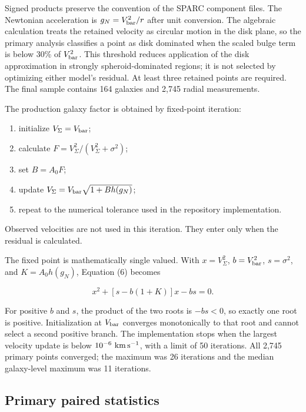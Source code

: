 \documentclass[utf8]{frontiers_suppmat}
\providecommand{\tightlist}{}
\begin{document}
Signed products preserve the convention of the SPARC component files. The Newtonian acceleration is \(g_N=V_{\rm bar}^2/r\) after unit conversion. The algebraic calculation treats the retained velocity as circular motion in the disk plane, so the primary analysis classifies a point as disk dominated when the scaled bulge term is below 30\% of \(V_{\rm bar}^2\). This threshold reduces application of the disk approximation in strongly spheroid-dominated regions; it is not selected by optimizing either model's residual. At least three retained points are required. The final sample contains 164 galaxies and 2,745 radial measurements.

The production galaxy factor is obtained by fixed-point iteration:

\begin{enumerate}
\def\labelenumi{\arabic{enumi}.}
\tightlist
\item
  initialize \(V_\Sigma=V_{\rm bar}\);
\item
  calculate \(F=V_\Sigma^2/(V_\Sigma^2+\sigma^2)\);
\item
  set \(B=A_0F\);
\item
  update \(V_\Sigma=V_{\rm bar}\sqrt{1+B h(g_N)}\);
\item
  repeat to the numerical tolerance used in the repository implementation.
\end{enumerate}

Observed velocities are not used in this iteration. They enter only when the residual is calculated.

The fixed point is mathematically single valued. With \(x=V_\Sigma^2\), \(b=V_{\rm bar}^2\), \(s=\sigma^2\), and \(K=A_0h(g_N)\), Equation (6) becomes

\[
x^2+[s-b(1+K)]x-bs=0.
\]

For positive \(b\) and \(s\), the product of the two roots is \(-bs<0\), so exactly one root is positive. Initialization at \(V_{\rm bar}\) converges monotonically to that root and cannot select a second positive branch. The implementation stops when the largest velocity update is below \(10^{-6}\ {\rm km\,s^{-1}}\), with a limit of 50 iterations. All 2,745 primary points converged; the maximum was 26 iterations and the median galaxy-level maximum was 11 iterations.

\subsection{Primary paired statistics}\label{s4.2-primary-paired-statistics}
\end{document}
